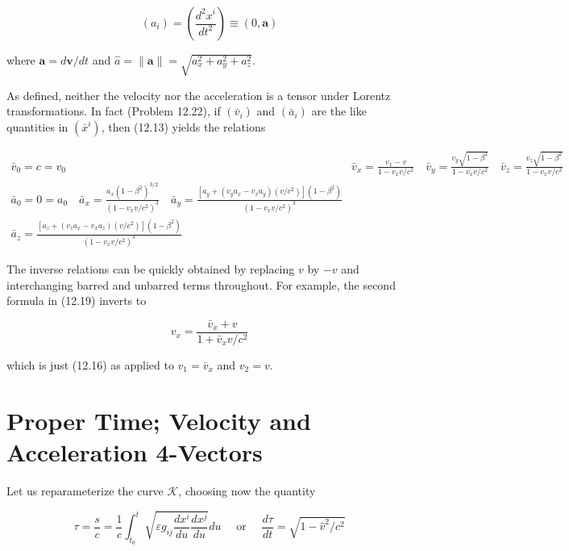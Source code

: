 \documentclass[10pt]{article}
\begin{document}
\begin{equation*}
\left(a_{i}\right)=\left(\frac{d^{2} x^{i}}{d t^{2}}\right) \equiv(0, \mathbf{a}) \tag{12.18}
\end{equation*}


where $\mathbf{a}=d \mathbf{v} / d t$ and $\hat{a}=\|\mathbf{a}\|=\sqrt{a_{x}^{2}+a_{y}^{2}+a_{z}^{2}}$.

As defined, neither the velocity nor the acceleration is a tensor under Lorentz transformations. In fact (Problem 12.22), if $\left(\bar{v}_{i}\right)$ and $\left(\bar{a}_{i}\right)$ are the like quantities in $\left(\bar{x}^{i}\right)$, then (12.13) yields the relations

\[
\begin{array}{cc}
\bar{v}_{0}=c=v_{0} & \bar{v}_{x}=\frac{v_{x}-v}{1-v_{x} v / c^{2}} \quad \bar{v}_{y}=\frac{v_{y} \sqrt{1-\beta^{2}}}{1-v_{x} v / c^{2}} \quad \bar{v}_{z}=\frac{v_{z} \sqrt{1-\beta^{2}}}{1-v_{x} v / c^{2}} \\
\bar{a}_{0}=0=a_{0} \quad \bar{a}_{x}=\frac{a_{x}\left(1-\beta^{2}\right)^{3 / 2}}{\left(1-v_{x} v / c^{2}\right)^{3}} \quad \bar{a}_{y}=\frac{\left[a_{y}+\left(v_{y} a_{x}-v_{x} a_{y}\right)\left(v / c^{2}\right)\right]\left(1-\beta^{2}\right)}{\left(1-v_{x} v / c^{2}\right)^{3}} \\
\bar{a}_{z}=\frac{\left[a_{z}+\left(v_{z} a_{x}-v_{x} a_{z}\right)\left(v / c^{2}\right)\right]\left(1-\beta^{2}\right)}{\left(1-v_{x} v / c^{2}\right)^{3}} \tag{12.20}
\end{array}
\]

The inverse relations can be quickly obtained by replacing $v$ by $-v$ and interchanging barred and unbarred terms throughout. For example, the second formula in (12.19) inverts to

$$
v_{x}=\frac{\bar{v}_{x}+v}{1+\bar{v}_{x} v / c^{2}}
$$

which is just (12.16) as applied to $v_{1}=\bar{v}_{x}$ and $v_{2}=v$.

\section*{Proper Time; Velocity and Acceleration 4-Vectors}
Let us reparameterize the curve $\mathscr{K}$, choosing now the quantity


\begin{equation*}
\tau=\frac{s}{c}=\frac{1}{c} \int_{t_{0}}^{t} \sqrt{\varepsilon g_{i j} \frac{d x^{i}}{d u} \frac{d x^{j}}{d u}} d u \quad \text { or } \quad \frac{d \tau}{d t}=\sqrt{1-\hat{v}^{2} / c^{2}} \tag{12.21}
\end{equation*}
\end{document}
